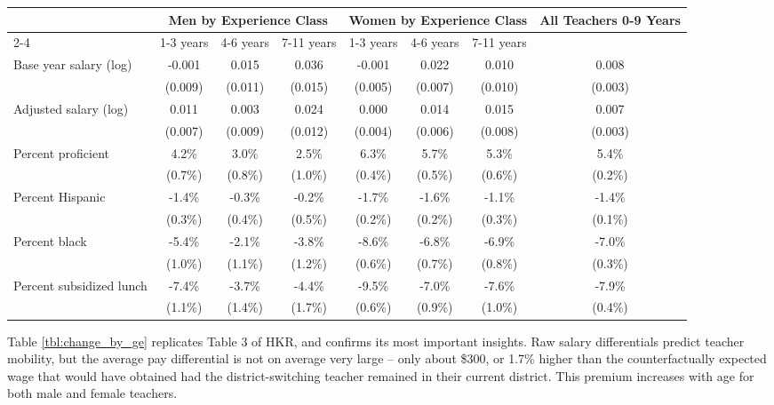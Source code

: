 \documentclass[12pt,]{article}
\begin{document}
\begin{sidewaystable}[htbp]
\centering
\begin{tabular}{lccccccc}
  \hline
 & \multicolumn{3}{c}{Men by Experience Class} & \multicolumn{3}{c}{Women by Experience Class} & \multirow{2}{*}{\parbox{0.1\linewidth}{All Teachers 0-9 Years}}\\ \cline{2-4} \cline{5-7}
 & 1-3 years & 4-6 years & 7-11 years & 1-3 years & 4-6 years & 7-11 years &  \\ 
  \hline
Base year salary (log) & -0.001 & 0.015 & 0.036 & -0.001 & 0.022 & 0.010 & 0.008 \\ 
   & (0.009) & (0.011) & (0.015) & (0.005) & (0.007) & (0.010) & (0.003) \\ 
  Adjusted salary (log) & 0.011 & 0.003 & 0.024 & 0.000 & 0.014 & 0.015 & 0.007 \\ 
   & (0.007) & (0.009) & (0.012) & (0.004) & (0.006) & (0.008) & (0.003) \\ 
  Percent proficient & 4.2\% & 3.0\% & 2.5\% & 6.3\% & 5.7\% & 5.3\% & 5.4\% \\ 
   & (0.7\%) & (0.8\%) & (1.0\%) & (0.4\%) & (0.5\%) & (0.6\%) & (0.2\%) \\ 
  Percent Hispanic & -1.4\% & -0.3\% & -0.2\% & -1.7\% & -1.6\% & -1.1\% & -1.4\% \\ 
   & (0.3\%) & (0.4\%) & (0.5\%) & (0.2\%) & (0.2\%) & (0.3\%) & (0.1\%) \\ 
  Percent black & -5.4\% & -2.1\% & -3.8\% & -8.6\% & -6.8\% & -6.9\% & -7.0\% \\ 
   & (1.0\%) & (1.1\%) & (1.2\%) & (0.6\%) & (0.7\%) & (0.8\%) & (0.3\%) \\ 
  Percent subsidized lunch & -7.4\% & -3.7\% & -4.4\% & -9.5\% & -7.0\% & -7.6\% & -7.9\% \\ 
   & (1.1\%) & (1.4\%) & (1.7\%) & (0.6\%) & (0.9\%) & (1.0\%) & (0.4\%) \\ 
   \hline
\end{tabular}
\caption{Average Change in Salary and District Student Characteristics (and Standard Deviations) for Teachers Changing Districts, by Gender and Experience} 
\label{tbl:change_by_ge}
\end{sidewaystable}

Table \ref{tbl:change_by_ge} replicates Table 3 of HKR, and confirms its
most important insights. Raw salary differentials predict teacher
mobility, but the average pay differential is not on average very large
-- only about \$300, or 1.7\% higher than the counterfactually expected
wage that would have obtained had the district-switching teacher
remained in their current district. This premium increases with age for
both male and female teachers.
\end{document}
